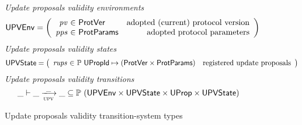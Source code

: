 \begin{figure}[htb]
  \emph{Update proposals validity environments}
  \begin{equation*}
    \UPVEnv =
    \left(
      \begin{array}{r@{~\in~}lr}
        \var{pv} & \ProtVer & \text{adopted (current) protocol version}\\
        \var{pps} & \ProtParams & \text{adopted protocol parameters}\\
      \end{array}
    \right)
  \end{equation*}
  \emph{Update proposals validity states}
  \begin{equation*}
    \UPVState
    = \left(
      \begin{array}{r@{~\in~}lr}
        \var{rups} & \powerset{\UPropId \mapsto (\ProtVer \times \ProtParams)}
        & \text{registered update proposals}\\
      \end{array}
    \right)
  \end{equation*}
  \emph{Update proposals validity transitions}
    \begin{equation*}
    \var{\_} \vdash
    \var{\_} \trans{upv}{\_} \var{\_}
    \subseteq \powerset (\UPVEnv \times \UPVState \times \UProp \times \UPVState)
  \end{equation*}
  \caption{Update proposals validity transition-system types}
  \label{fig:ts-types:up-validity}
\end{figure}

